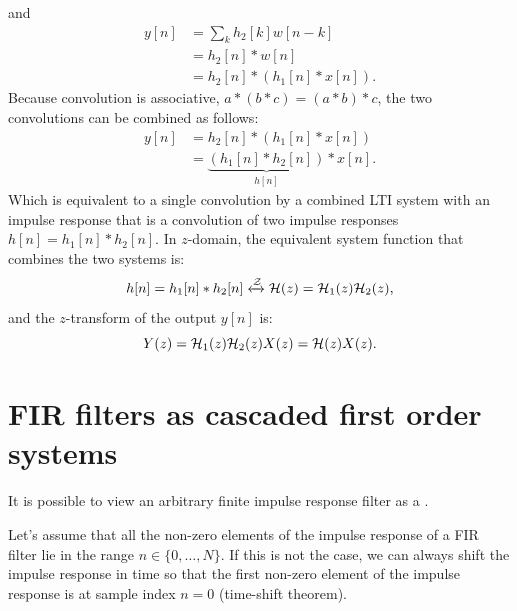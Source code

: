 \begin{marginfigure}
  \begin{center}
  \end{center}
\end{marginfigure}
\noindent and
\begin{align}
  y[n] & = \sum_k h_2[k]w[n-k]   \\
       & = h_2[n]*w[n]           \\
       & = h_2[n]*(h_1[n]*x[n]).
\end{align}
Because convolution is associative, $a*(b*c) =(a*b)*c$, the two
convolutions can be combined as follows:
\begin{align}
  y[n] & = h_2[n]*(h_1[n]*x[n])                       \\
       & = \underbrace{(h_1[n]*h_2[n])}_{h[n]} *x[n].
\end{align}
Which is equivalent to a single convolution by a combined LTI system
with an impulse response that is a convolution of two impulse
responses $h[n]=h_1[n]*h_2[n]$. In $z$-domain, the equivalent system
function that combines the two systems is:
\begin{equation}
  h[n] = h_1[n] * h_2[n] \xleftrightarrow{\mathcal{Z}} \mathcal{H}(z) = \mathcal{H}_1(z) \mathcal{H}_2(z),
\end{equation}
and the $z$-transform of the output $y[n]$ is:
\begin{equation}
  Y(z) = \mathcal{H}_1(z)\mathcal{H}_2(z) X(z) = \mathcal{H}(z) X(z).
\end{equation}

\section{FIR filters as cascaded first order systems}
It is possible to view an arbitrary finite impulse response filter as
a .

Let's assume that all the non-zero elements of the impulse response
of a FIR filter lie in the range $n \in \{0,\hdots,N\}$. If this is not the
case, we can always shift the impulse response in time so that the
first non-zero element of the impulse response is at sample index
$n=0$ (time-shift theorem).

